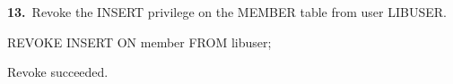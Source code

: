 \noindent\begin{minipage}{\linewidth}
\begingroup{}
{\fontsize{14}{17}\selectfont\textbf{13.}}\ Revoke the INSERT privilege on the MEMBER table from user LIBUSER.\par
\endgroup\vspace{12pt}


\begin{sqlcode}
REVOKE INSERT ON member FROM libuser;
\end{sqlcode}

\vspace{18pt}


\begin{sqlout}[fontsize=\small]
Revoke succeeded.
\end{sqlout}
\end{minipage}\par\vspace{24pt}

